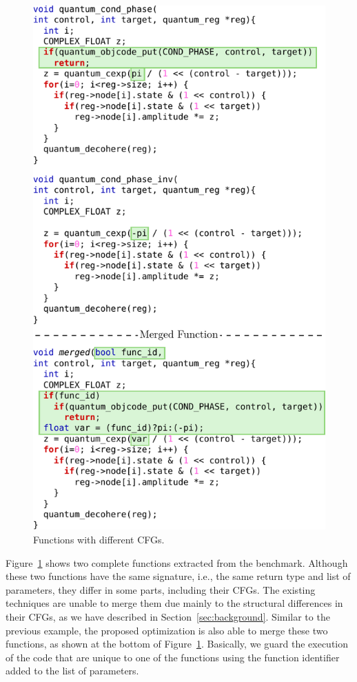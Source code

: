 \begin{figure}[th]
  \centering
  \includegraphics[width=\linewidth]{figs/libquantum-example.pdf}
  \caption{Functions with different CFGs.}
  \label{fig:libquantum-example}
\end{figure}

Figure~\ref{fig:libquantum-example} shows two complete functions extracted from
the  benchmark.
Although these two functions have the same signature, i.e., the same return type
and list of parameters, they differ in some parts, including their CFGs.
The existing techniques are unable to merge them due mainly to the structural
differences in their CFGs, as we have described in Section~\ref{sec:background}. 
Similar to the previous example, the proposed optimization is also able to merge
these two functions, as shown at the bottom of Figure~\ref{fig:libquantum-example}.
Basically, we guard the execution of the code that are unique to one of the
functions using the function identifier added to the list of parameters.

